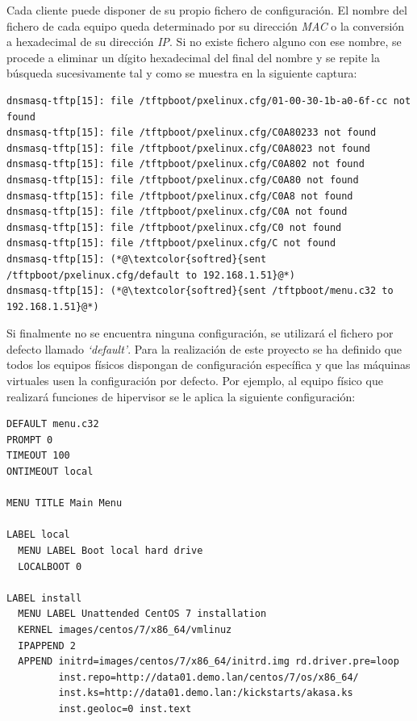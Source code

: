 \documentclass[a4paper,12pt,spanish,final]{epsc_tfc_pfc}
\begin{document}
Cada cliente puede disponer de su propio fichero de configuración. El nombre del fichero de cada equipo queda determinado por su dirección \emph{MAC} o la conversión a hexadecimal de su dirección \emph{IP}. Si no existe fichero alguno con ese nombre, se procede a eliminar un dígito hexadecimal del final del nombre y se repite la búsqueda sucesivamente tal y como se muestra en la siguiente captura:\\

\begin{lstlisting}[style=dnsmasq]
dnsmasq-tftp[15]: file /tftpboot/pxelinux.cfg/01-00-30-1b-a0-6f-cc not found
dnsmasq-tftp[15]: file /tftpboot/pxelinux.cfg/C0A80233 not found
dnsmasq-tftp[15]: file /tftpboot/pxelinux.cfg/C0A8023 not found
dnsmasq-tftp[15]: file /tftpboot/pxelinux.cfg/C0A802 not found
dnsmasq-tftp[15]: file /tftpboot/pxelinux.cfg/C0A80 not found
dnsmasq-tftp[15]: file /tftpboot/pxelinux.cfg/C0A8 not found
dnsmasq-tftp[15]: file /tftpboot/pxelinux.cfg/C0A not found
dnsmasq-tftp[15]: file /tftpboot/pxelinux.cfg/C0 not found
dnsmasq-tftp[15]: file /tftpboot/pxelinux.cfg/C not found
dnsmasq-tftp[15]: (*@\textcolor{softred}{sent /tftpboot/pxelinux.cfg/default to 192.168.1.51}@*)
dnsmasq-tftp[15]: (*@\textcolor{softred}{sent /tftpboot/menu.c32 to 192.168.1.51}@*)
\end{lstlisting}

Si finalmente no se encuentra ninguna configuración, se utilizará el fichero por defecto llamado \emph{`default'}. Para la realización de este proyecto se ha definido que todos los equipos físicos dispongan de configuración específica y que las máquinas virtuales usen la configuración por defecto. Por ejemplo, al equipo físico que realizará funciones de hipervisor se le aplica la siguiente configuración:\\

\begin{lstlisting}[style=dnsmasq]
DEFAULT menu.c32
PROMPT 0
TIMEOUT 100
ONTIMEOUT local

MENU TITLE Main Menu

LABEL local
  MENU LABEL Boot local hard drive
  LOCALBOOT 0

LABEL install
  MENU LABEL Unattended CentOS 7 installation
  KERNEL images/centos/7/x86_64/vmlinuz
  IPAPPEND 2
  APPEND initrd=images/centos/7/x86_64/initrd.img rd.driver.pre=loop
         inst.repo=http://data01.demo.lan/centos/7/os/x86_64/
         inst.ks=http://data01.demo.lan:/kickstarts/akasa.ks
         inst.geoloc=0 inst.text
\end{lstlisting}
\end{document}
